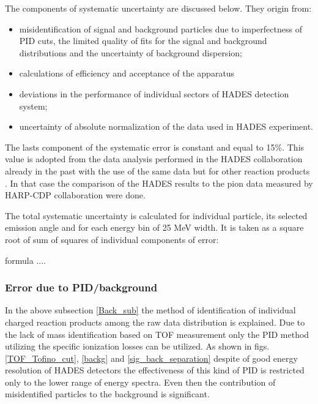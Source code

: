 The components of systematic uncertainty are discussed below. They origin from:
\begin{itemize}
	\item misidentification of signal and background particles 
	due to imperfectness of PID cuts, the limited quality of fits for the signal and background distributions 
	and the uncertainty of background dispersion; 
	\item calculations of efficiency and acceptance of the apparatus
	\item deviations in the performance  of individual sectors of HADES detection system;
	\item uncertainty of absolute normalization of the data used in HADES experiment.  
\end{itemize}

The lasts component of the systematic error is constant and equal to 15\%.
This value is adopted from the data analysis performed in the HADES collaboration already 
in the past with the use of the same data but for other reaction products \cite{AgakishievPionP,Tlusty, Lorentz_PhD}.
In that case the comparison of the HADES results to the pion data measured by HARP-CDP collaboration \cite{Tlusty} 
were done.

The total systematic uncertainty is calculated for individual particle, 
its selected emission angle and for each energy bin of 25 MeV width.
It is taken as a square root of sum of squares of individual components of error: \\

\hspace{5cm}

formula .... \\



\subsubsection{\label{pid/back} Error due to PID/background}

In the above subsection \ref{Back_sub} the method of identification of individual charged reaction products 
among the raw data distribution is explained. Due to the lack of mass identification based on TOF measurement 
only the PID method utilizing the specific ionization losses can be utilized. As shown in figs.  
\ref{TOF_Tofino_cut}, \ref{backg} and \ref{sig_back_separation} despite of good energy resolution of HADES detectors 
the effectiveness of this kind of PID is restricted only to the lower range of energy spectra. 
Even then the contribution of misidentified particles to the background is significant. 

